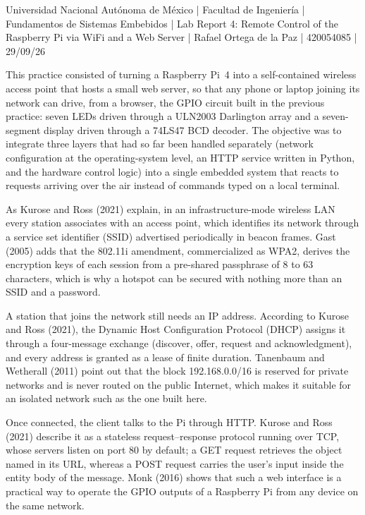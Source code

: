 \documentclass[11pt,letterpaper]{article}
\newcommand{\sect}[1]{\par\medskip\noindent{\large\bfseries #1}\par\smallskip}
\begin{document}
\noindent Universidad Nacional Autónoma de México | Facultad de Ingeniería | Fundamentos de Sistemas Embebidos | Lab Report 4: Remote Control of the Raspberry Pi via WiFi and a Web Server | Rafael Ortega de la Paz | 420054085 | 29/09/26

\sect{Introduction}

This practice consisted of turning a Raspberry Pi~4 into a self-contained wireless access point that hosts a small web server, so that any phone or laptop joining its network can drive, from a browser, the GPIO circuit built in the previous practice: seven LEDs driven through a ULN2003 Darlington array and a seven-segment display driven through a 74LS47 BCD decoder. The objective was to integrate three layers that had so far been handled separately (network configuration at the operating-system level, an HTTP service written in Python, and the hardware control logic) into a single embedded system that reacts to requests arriving over the air instead of commands typed on a local terminal.

\sect{Background}

As Kurose and Ross (2021) explain, in an infrastructure-mode wireless LAN every station associates with an access point, which identifies its network through a service set identifier (SSID) advertised periodically in beacon frames. Gast (2005) adds that the 802.11i amendment, commercialized as WPA2, derives the encryption keys of each session from a pre-shared passphrase of 8 to 63 characters, which is why a hotspot can be secured with nothing more than an SSID and a password.

A station that joins the network still needs an IP address. According to Kurose and Ross (2021), the Dynamic Host Configuration Protocol (DHCP) assigns it through a four-message exchange (discover, offer, request and acknowledgment), and every address is granted as a lease of finite duration. Tanenbaum and Wetherall (2011) point out that the block 192.168.0.0/16 is reserved for private networks and is never routed on the public Internet, which makes it suitable for an isolated network such as the one built here.

Once connected, the client talks to the Pi through HTTP. Kurose and Ross (2021) describe it as a stateless request--response protocol running over TCP, whose servers listen on port 80 by default; a GET request retrieves the object named in its URL, whereas a POST request carries the user's input inside the entity body of the message. Monk (2016) shows that such a web interface is a practical way to operate the GPIO outputs of a Raspberry Pi from any device on the same network.
\end{document}
